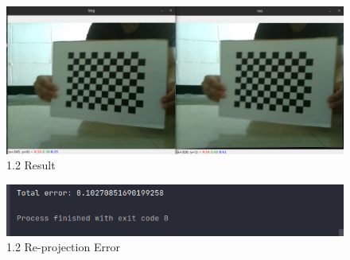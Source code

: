 \documentclass[a4paper, 12pt]{article}
\begin{document}
	\begin{figure}
		\caption{1.2 Result}
		\includegraphics[scale=0.3]{images/refined_result.png}
	\end{figure}
	
	\begin{figure}
		\caption{1.2 Re-projection Error}
		\includegraphics[scale=0.65]{images/reprojection_error.png}
	\end{figure}
\end{document}
